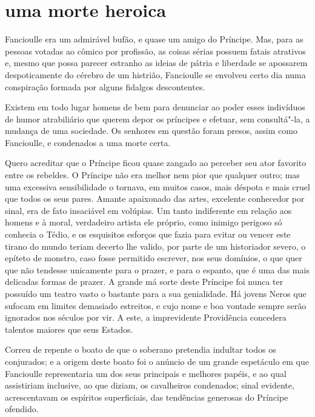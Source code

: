 \quebra\section[Uma morte heroica]{uma morte heroica}

Fancioulle era um admirável bufão, e quase um amigo do Príncipe. Mas,
para as pessoas votadas ao cômico por profissão, as coisas sérias possuem
fatais atrativos e, mesmo que possa parecer estranho as ideias de
pátria e liberdade se apossarem despoticamente do cérebro de um
histrião, Fancioulle se envolveu certo dia numa conspiração formada por alguns
fidalgos descontentes.

Existem em todo lugar homens de bem para denunciar ao poder esses
indivíduos de humor atrabiliário que querem depor os príncipes e
efetuar, sem consultá"-la, a mudança de uma sociedade. Os senhores em
questão foram presos, assim como Fancioulle, e condenados a uma morte
certa.

Quero acreditar que o Príncipe ficou quase zangado ao
perceber seu ator favorito entre os rebeldes. O Príncipe não era
melhor nem pior que qualquer outro; mas uma excessiva sensibilidade o tornava,
em muitos casos, mais déspota e mais cruel que todos os seus pares.
Amante apaixonado das artes, excelente conhecedor por sinal, era de fato
insaciável em volúpias. Um tanto indiferente em relação aos homens e à
moral, verdadeiro artista ele próprio, como inimigo perigoso só conhecia
o Tédio, e os esquisitos esforços que fazia para evitar ou
vencer este tirano do mundo teriam decerto lhe valido, por parte de
um historiador severo, o epíteto de
monstro, caso fosse permitido escrever, nos seus
domínios, o que quer que não tendesse unicamente
para o prazer, e para o espanto, que é uma das mais delicadas formas de
prazer. A grande má sorte deste Príncipe foi nunca ter possuído
um teatro vasto o bastante para a sua genialidade. Há jovens Neros que
sufocam em limites demasiado estreitos, e cujo nome e boa vontade sempre serão ignorados nos séculos por vir. A este, a imprevidente
Providência concedera talentos maiores que seus Estados.

Correu de repente o boato de que o soberano pretendia indultar todos os
conjurados; e a origem deste boato foi o anúncio de um grande
espetáculo em que Fancioulle representaria um dos seus principais e
melhores papéis, e ao qual assistiriam inclusive, ao que diziam, os
cavalheiros condenados; sinal evidente, acrescentavam os espíritos
superficiais, das tendências generosas do Príncipe ofendido.

